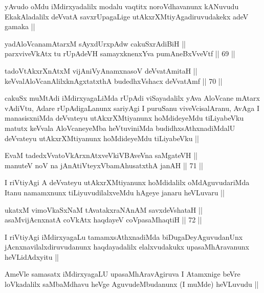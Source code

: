 \begin{artha}
yAvudo oMdu iMdirxyadalilx modalu vaqtitx noroVdhavanunx kANuvudu
EkakAladalilx deVvatA savxrUpagaLige utAkxrXMtiyAgadiruvudakekx adeV
gamaka ||
\end{artha}

\begin{shl}
yadA\s \s loVcanamAtarxM sAyxdUrxpAdw cakuSxrAdiBiH || \\
parxviveVkAtx tu rUpAdeVH samayxknenxYva pumAneBxVveVtf ||  69 ||  
\end{shl}
				
\begin{shl}
tadoVtAkxrXnAtxM vijAniVyAnamxnasoV deVvatAmitaH || \\
keVvalAloVcanAlilxknAgxtatxthA budedhxVshacx deVvatAmf ||  70 ||  
\end{shl}

\begin{artha}
cakuSx muMtAdi iMdirxyagaLiMda rUpAdi viSayadalilx yAva AloVcane
mAtarx vAdiVtu, Adare rUpAdigaLanunx sariyAgi I puruSanu
viveVcisalAranu, AvAga I manasisxniMda deVvateyu utAkxrXMtiyanunx
hoMdideyeMdu tiLiyabeVku matutx keVvala AloVcaneyeMba heVtuviniMda
budidhxsAthxnadiMdalU deVvateyu utAkxrXMtiyanunx hoMdideyeMdu
tiLiyabeVku ||
\end{artha}

\begin{shl}
EvaM tadedxVvatoVkArxnAtxveVkiVBAveVna saMgateVH || \\
manuteV noV na jAnAtiVteyxVbamAhusatxthA janAH ||  71 ||  
\end{shl}

\begin{artha}
I riVtiyAgi A deVvateyu utAkxrXMtiyanunx hoMdidalilx oMdAguvudariMda
Itanu namamxnunx tiLiyuvudilalxveMdu hAgeye janaru heVLuvaru ||
\end{artha}

\begin{shl}
ukatxM vimoVkaSxNaM tAvatakxraNAnAM savxdeVshataH || \\
asaMvijAcnxnatA coVkAtx haqdayeV coVpasaMhaqtiH ||  72 ||  
\end{shl}

\begin{artha}
I riVtiyAgi iMdirxyagaLu tamamxsAthxnadiMda biDugaDeyAguvudanUnx
jAcnxnavilalxdiruvudanunx haqdayadalilx elalxvudakukx upasaMhAravanunx
heVLidAdxyitu ||
\end{artha}

\begin{artha}
AmeVle samasatx iMdirxyagaLU upasaMhAravAgiruva I Atamxnige beVre
loVkadalilx saMbaMdhavu heVge AguvudeMbudanunx (I muMde) heVLuvudu ||
\end{artha}

